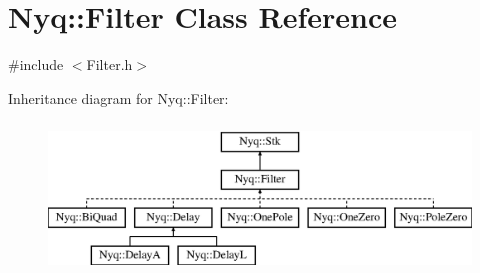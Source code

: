 \hypertarget{class_nyq_1_1_filter}{}\section{Nyq\+:\+:Filter Class Reference}
\label{class_nyq_1_1_filter}


{\ttfamily \#include $<$Filter.\+h$>$}

Inheritance diagram for Nyq\+:\+:Filter\+:\begin{figure}[H]
\begin{center}
\leavevmode
\includegraphics[height=4.000000cm]{class_nyq_1_1_filter}
\end{center}
\end{figure}
